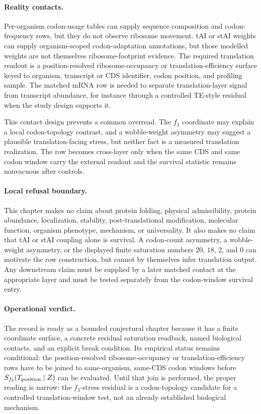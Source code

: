 \paragraph{Reality contacts.}
Per-organism codon-usage tables can supply sequence composition and codon-frequency rows, but they do not observe ribosome movement.  tAI or stAI weights can supply organism-scoped codon-adaptation annotations, but those modelled weights are not themselves ribosome-footprint evidence.  The required translation readout is a position-resolved ribosome-occupancy or translation-efficiency surface keyed to organism, transcript or CDS identifier, codon position, and profiling sample.  The matched mRNA row is needed to separate translation-layer signal from transcript abundance, for instance through a controlled TE-style residual when the study design supports it.

This contact design prevents a common overread.  The $f_3$ coordinate may explain a local codon-topology contrast, and a wobble-weight asymmetry may suggest a plausible translation-facing stress, but neither fact is a measured translation realization.  The row becomes cross-layer only when the same CDS and same codon window carry the external readout and the survival statistic remains nonvacuous after controls.

\paragraph{Local refusal boundary.}
This chapter makes no claim about protein folding, physical admissibility, protein abundance, localization, stability, post-translational modification, molecular function, organism phenotype, mechanism, or universality.  It also makes no claim that tAI or stAI coupling alone is survival.  A codon-count asymmetry, a wobble-weight asymmetry, or the displayed finite saturation numbers $20$, $18$, $2$, and $0$ can motivate the row construction, but cannot by themselves infer translation output.  Any downstream claim must be supplied by a later matched contact at the appropriate layer and must be tested separately from the codon-window survival entry.

\paragraph{Operational verdict.}
The record is ready as a bounded conjectural chapter because it has a finite coordinate surface, a concrete residual saturation readback, named biological contacts, and an explicit break condition.  Its empirical status remains conditional: the position-resolved ribosome-occupancy or translation-efficiency rows have to be joined to same-organism, same-CDS codon windows before $S_{f_3}(T_{\rm position}\mid Z)$ can be evaluated.  Until that join is performed, the proper reading is narrow: the $f_3$-stress residual is a codon-topology candidate for a controlled translation-window test, not an already established biological mechanism.


